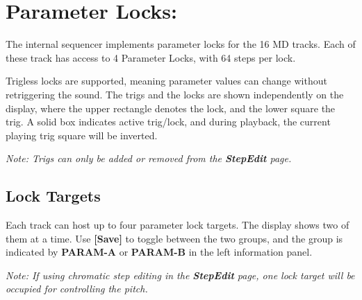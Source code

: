 \chapter{Parameter Locks:}
The internal sequencer implements parameter locks for the 16 MD tracks. Each of these track has access to 4 Parameter Locks, with 64 steps per lock. 


Trigless locks are supported, meaning parameter values can change without retriggering the sound.
The trigs and the locks are shown independently on the display, where the upper rectangle denotes the lock, and the lower square the trig.
A solid box indicates active trig/lock, and during playback, the current playing trig square will be inverted.


\textit{Note: Trigs can only be added or removed from the \textbf{StepEdit} page.}

\section{Lock Targets}

Each track can host up to four parameter lock targets. The display shows two of them at a time. Use \textbf{[Save]} to toggle between the two groups, and the group is indicated by \textbf{PARAM-A} or \textbf{PARAM-B} in the left information panel.

\textit{Note: If using chromatic step editing in the \textbf{StepEdit} page, one lock target will be occupied for controlling the pitch.}